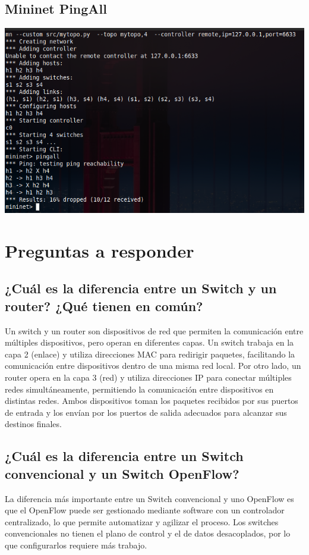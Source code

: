 \documentclass{article}
\begin{document}
\subsection{Mininet PingAll}
\begin{center}
  \includegraphics[scale=0.35]{Mininet_Banned_Tupled.png}
\end{center}

\section{Preguntas a responder}\label{preguntas-a-responder}

\subsection{¿Cuál es la diferencia entre un Switch y un router? ¿Qué tienen en común?}
Un switch y un router son dispositivos de red que permiten la comunicación entre múltiples dispositivos, pero operan en diferentes capas. Un switch trabaja en la capa 2 (enlace) y utiliza direcciones MAC para redirigir paquetes, facilitando la comunicación entre dispositivos dentro de una misma red local. Por otro lado, un router opera en la capa 3 (red) y utiliza direcciones IP para conectar múltiples redes simultáneamente, permitiendo la comunicación entre dispositivos en distintas redes. Ambos dispositivos toman los paquetes recibidos por sus puertos de entrada y los envían por los puertos de salida adecuados para alcanzar sus destinos finales.


\subsection{¿Cuál es la diferencia entre un Switch convencional y un Switch OpenFlow?}
La diferencia más importante entre un Switch convencional y uno OpenFlow es que el OpenFlow puede ser gestionado mediante software con un controlador centralizado, lo que permite automatizar y agilizar el proceso. Los switches convencionales no tienen el plano de control y el de datos desacoplados, por lo que configurarlos requiere más trabajo.
\end{document}

